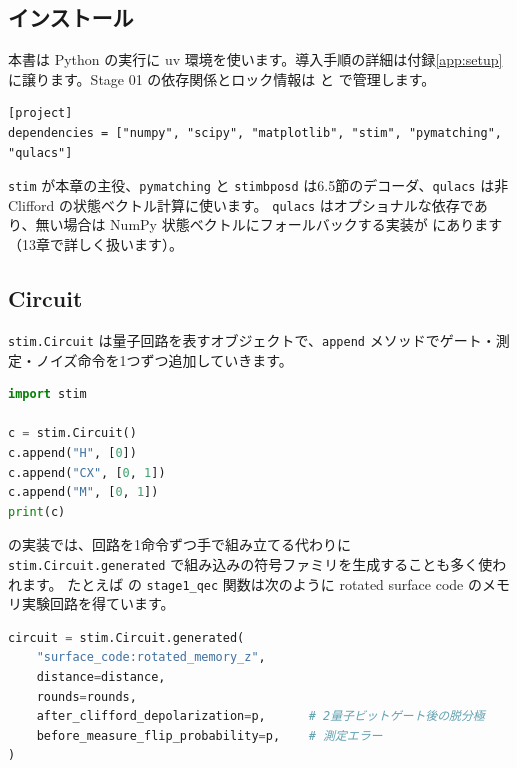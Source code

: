 \subsection{インストール}

本書は Python の実行に uv 環境を使います。導入手順の詳細は付録\ref{app:setup}に譲ります。Stage 01 の依存関係とロック情報は  と  で管理します。

\begin{lstlisting}[caption={pyproject.toml の依存関係の記法（抜粋）}]
[project]
dependencies = ["numpy", "scipy", "matplotlib", "stim", "pymatching", "qulacs"]
\end{lstlisting}

\texttt{stim} が本章の主役、\texttt{pymatching} と \texttt{stimbposd} は6.5節のデコーダ、\texttt{qulacs} は非 Clifford の状態ベクトル計算に使います。
\texttt{qulacs} はオプショナルな依存であり、無い場合は NumPy 状態ベクトルにフォールバックする実装が  にあります（13章で詳しく扱います）。

\subsection{Circuit}

\texttt{stim.Circuit} は量子回路を表すオブジェクトで、\texttt{append} メソッドでゲート・測定・ノイズ命令を1つずつ追加していきます。

\begin{lstlisting}[language=Python, caption={最小のベル状態回路}]
import stim

c = stim.Circuit()
c.append("H", [0])
c.append("CX", [0, 1])
c.append("M", [0, 1])
print(c)
\end{lstlisting}

 の実装では、回路を1命令ずつ手で組み立てる代わりに \texttt{stim.Circuit.generated} で組み込みの符号ファミリを生成することも多く使われます。
たとえば  の \texttt{stage1\_qec} 関数は次のように rotated surface code のメモリ実験回路を得ています。

\begin{lstlisting}[language=Python, caption={src/stages/01\_mpp/src/ftqc/ftqc\_toy.py の抜粋（stage1\_qec 内）}]
circuit = stim.Circuit.generated(
    "surface_code:rotated_memory_z",
    distance=distance,
    rounds=rounds,
    after_clifford_depolarization=p,      # 2量子ビットゲート後の脱分極
    before_measure_flip_probability=p,    # 測定エラー
)
\end{lstlisting}

